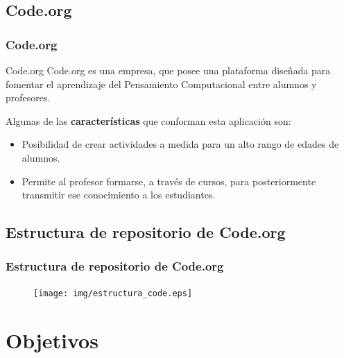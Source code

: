 \documentclass{beamer}
\begin{document}
\subsection{Code.org}

\begin{frame}

\frametitle{Code.org}

\begin{block}{Code.org}
    Code.org es una empresa, que posee una plataforma diseñada para fomentar el aprendizaje del Pensamiento Computacional entre alumnos y profesores.
\end{block}

Algunas de las \textbf{características} que conforman esta aplicación son:
\begin{itemize}
    \item Posibilidad de crear actividades a medida para un alto rango de edades de alumnos.
    \item Permite al profesor formarse, a través de cursos, para posteriormente transmitir ese conocimiento a los estudiantes.
\end{itemize}

\end{frame}

\subsection{Estructura de repositorio de Code.org}

\begin{frame}

\frametitle{Estructura de repositorio de Code.org}

\begin{figure}
    \texttt{[image: img/estructura\_code.eps]}
\end{figure}

\end{frame}

\section{Objetivos}
\end{document}
